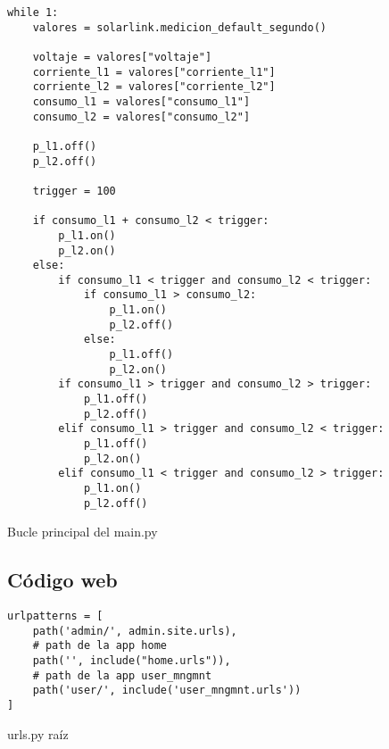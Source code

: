 \begin{listing}[H]
\begin{verbatim}
while 1:
    valores = solarlink.medicion_default_segundo()

    voltaje = valores["voltaje"]
    corriente_l1 = valores["corriente_l1"]
    corriente_l2 = valores["corriente_l2"]
    consumo_l1 = valores["consumo_l1"]
    consumo_l2 = valores["consumo_l2"]

    p_l1.off()
    p_l2.off()
   
    trigger = 100

    if consumo_l1 + consumo_l2 < trigger:
        p_l1.on()
        p_l2.on()
    else:
        if consumo_l1 < trigger and consumo_l2 < trigger:
            if consumo_l1 > consumo_l2:
                p_l1.on()
                p_l2.off()
            else:
                p_l1.off()
                p_l2.on()
        if consumo_l1 > trigger and consumo_l2 > trigger:
            p_l1.off()
            p_l2.off()
        elif consumo_l1 > trigger and consumo_l2 < trigger:
            p_l1.off()
            p_l2.on()
        elif consumo_l1 < trigger and consumo_l2 > trigger:
            p_l1.on()
            p_l2.off()
\end{verbatim}
\caption{Bucle principal del main.py}
\label{bucle main}
\end{listing}

\subsection{Código web}


\begin{listing}[H]
\begin{verbatim}
urlpatterns = [
    path('admin/', admin.site.urls),
    # path de la app home
    path('', include("home.urls")),
    # path de la app user_mngmnt
    path('user/', include('user_mngmnt.urls'))
]
\end{verbatim}
\caption{urls.py raíz}
\label{urls.py_raiz}
\end{listing}

